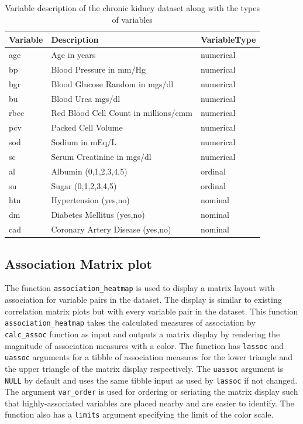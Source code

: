 \begin{Schunk}
\begin{table}

\caption{\label{tab:ckd}Variable description of the chronic kidney dataset along with the types of variables}
\centering
\begin{tabular}[t]{lll}
\toprule
Variable & Description & VariableType\\
\midrule
age & Age in years & numerical\\
bp & Blood Pressure in mm/Hg & numerical\\
bgr & Blood Glucose Random in mgs/dl & numerical\\
bu & Blood Urea mgs/dl & numerical\\
rbcc & Red Blood Cell Count in millions/cmm & numerical\\
\addlinespace
pcv & Packed  Cell Volume & numerical\\
sod & Sodium in mEq/L & numerical\\
sc & Serum Creatinine in mgs/dl & numerical\\
al & Albumin (0,1,2,3,4,5) & ordinal\\
su & Sugar (0,1,2,3,4,5) & ordinal\\
\addlinespace
htn & Hypertension (yes,no) & nominal\\
dm & Diabetes Mellitus (yes,no) & nominal\\
cad & Coronary Artery Disease (yes,no) & nominal\\
\bottomrule
\end{tabular}
\end{table}

\end{Schunk}

\hypertarget{association-matrix-plot}{%
\subsection{Association Matrix plot}\label{association-matrix-plot}}

The function \texttt{association\_heatmap} is used to display a matrix
layout with association for variable pairs in the dataset. The display
is similar to existing correlation matrix plots but with every variable
pair in the dataset. This function \texttt{association\_heatmap} takes
the calculated measures of association by \texttt{calc\_assoc} function
as input and outputs a matrix display by rendering the magnitude of
association measures with a color. The function has \texttt{lassoc} and
\texttt{uassoc} arguments for a tibble of association measures for the
lower triangle and the upper triangle of the matrix display
respectively. The \texttt{uassoc} argument is \texttt{NULL} by default
and uses the same tibble input as used by \texttt{lassoc} if not
changed. The argument \texttt{var\_order} is used for ordering or
seriating the matrix display such that highly-associated variables are
placed nearby and are easier to identify. The function also has a
\texttt{limits} argument specifying the limit of the color scale.

